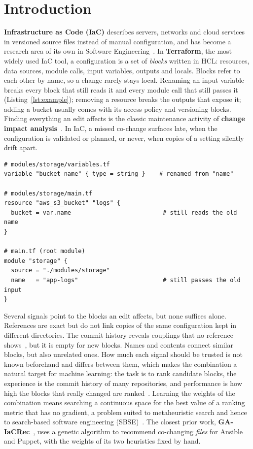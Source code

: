 \section{Introduction}
\label{sec:introduction}

\textbf{Infrastructure as Code (IaC)} describes servers, networks and cloud services in versioned source
files instead of manual configuration, and has become a research area of its own in Software
Engineering~\cite{rahman2019iacmapping}. In \textbf{Terraform}, the most widely used IaC tool, a
configuration is a set of \emph{blocks} written in HCL: resources, data sources, module calls,
input variables, outputs and locals. Blocks refer to each other by name, so a change rarely stays
local. Renaming an input variable breaks every block that still reads it and every module call that
still passes it (Listing~\ref{lst:example}); removing a resource breaks the outputs that expose it;
adding a bucket usually comes with its access policy and versioning blocks. Finding everything an
edit affects is the classic maintenance activity of \textbf{change impact
analysis}~\cite{bohner1996cia}. In IaC, a missed co-change surfaces late, when the configuration is
validated or planned, or never, when copies of a setting silently drift apart.

\begin{lstlisting}[style=hcl, caption={\small A variable rename inside a module and the two blocks it breaks.}, label={lst:example}, float=t]
# modules/storage/variables.tf
variable "bucket_name" { type = string }    # renamed from "name"

# modules/storage/main.tf
resource "aws_s3_bucket" "logs" {
  bucket = var.name                          # still reads the old name
}

# main.tf (root module)
module "storage" {
  source = "./modules/storage"
  name   = "app-logs"                        # still passes the old input
}
\end{lstlisting}

Several signals point to the blocks an edit affects, but none suffices alone. References are exact
but do not link copies of the same configuration kept in different directories. The commit
history reveals couplings that no reference shows~\cite{zimmermann2004rose}, but it is empty for new
blocks. Names and contents connect similar blocks, but also unrelated ones. How much each signal
should be trusted is not known beforehand and differs between them, which makes the combination a
natural target for machine learning: the task is to rank candidate blocks, the experience is the
commit history of many repositories, and performance is how high the blocks that really changed
are ranked~\cite{mitchell1997ml}. Learning the weights of the combination means searching a
continuous space for the best value of a ranking metric that has no gradient, a problem suited to
metaheuristic search and hence to search-based software engineering
(SBSE)~\cite{harman2001sbse}. The closest prior work, \textbf{GA-IaCRec}~\cite{bessghaier2026iacrec}, uses a
genetic algorithm to recommend co-changing \emph{files} for Ansible and Puppet, with the weights of
its two heuristics fixed by hand.

